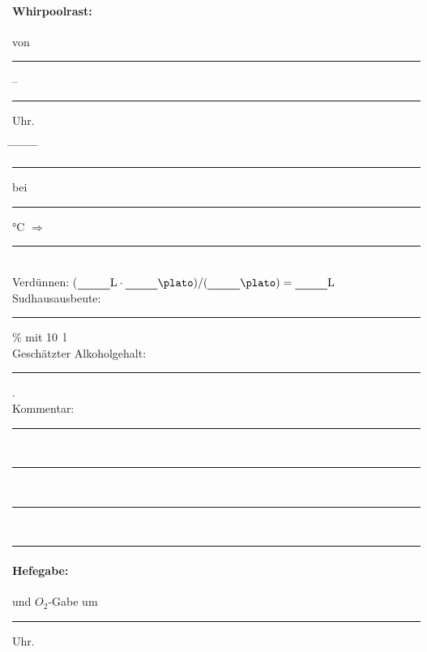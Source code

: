 \documentclass[12pt,oneside,a4paper]{scrartcl}
\newcommand{\Zeitluecke}{\rule[-0.1cm]{1.8cm}{0.5pt}}
\begin{document}
{\paragraph{Whirpoolrast:} von \Zeitluecke -- \Zeitluecke Uhr.
	\begin{tabbing}
		\hspace{1cm} \= \hspace{1cm} \= \hspace{1cm} \= \hspace{1cm} \= \hspace{1cm} \= \hspace{1cm} \= \hspace{1cm} \= \hspace{1cm} \= \kill
		\> \> \> \rule[-0.1cm]{0.6cm}{0.5pt}\si{\plato} \> bei \> \rule[-0.1cm]{0.6cm}{0.5pt}\si{\degreeCelsius} \> $\Rightarrow$ \> \rule[-0.1cm]{0.6cm}{0.5pt}\si{\plato}\\
		\> \> Verdünnen: \> \> \> \> \> ($\rule[-0.1cm]{1cm}{0.5pt}\si{\litre} \cdot \rule[-0.1cm]{1cm}{0.5pt}\si{\plato})/(\rule[-0.1cm]{1cm}{0.5pt}\si{\plato})= \rule[-0.1cm]{1cm}{0.5pt}\si{\litre}$\\
		\> \> Sudhausausbeute: \> \> \> \> \> \rule[-0.1cm]{1cm}{0.5pt}\si{\percent} mit \SI{10}{\litre}\\
		\> \> Geschätzter Alkoholgehalt: \> \> \> \> \> \rule[-0.1cm]{1cm}{0.5pt}\si{\pervol}.\\
				\> Kommentar: \>\>\> \rule[-0.1cm]{13cm}{0.5pt}\\
		\> \>  \rule[-0.1cm]{15.3cm}{0.5pt}\\
		\> \>  \rule[-0.1cm]{15.3cm}{0.5pt}\\
		\> \>  \rule[-0.1cm]{15.3cm}{0.5pt}
	\end{tabbing}
%
\paragraph{Hefegabe:} und $O_2$-Gabe um \Zeitluecke Uhr.
%
}
\end{document}
